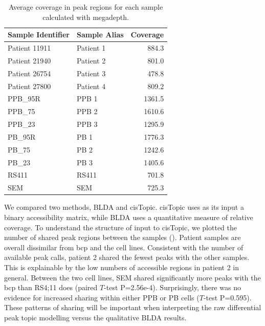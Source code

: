 \begin{table}[]
    \centering
    \begin{tabular}{@{}llr@{}}
    \toprule
    Sample Identifier & Sample Alias & Coverage \\ \midrule
    Patient 11911     & Patient 1    & 884.3                        \\
    Patient 21940     & Patient 2    & 801.0                        \\
    Patient 26754     & Patient 3    & 478.8                        \\
    Patient 27800     & Patient 4    & 809.2                        \\
    PPB\_95R          & PPB 1        & 1361.5                       \\
    PPB\_75           & PPB 2        & 1610.6                       \\
    PPB\_23           & PPB 3        & 1295.9                       \\
    PB\_95R           & PB 1         & 1776.3                       \\
    PB\_75            & PB 2         & 1242.6                       \\
    PB\_23            & PB 3         & 1405.6                       \\
    RS411             & RS411        & 701.8                        \\
    SEM               & SEM          & 725.3                        \\ \bottomrule
    \end{tabular}
    \caption{Average coverage in peak regions for each sample calculated with megadepth.}
    \label{table:mll_cov}
\end{table}

We compared two methods, BLDA and cisTopic. cisTopic uses as its input a binary accessibility matrix, while BLDA uses a quantitative measure of relative coverage. To understand the structure of input to cisTopic, we plotted the number of shared peak regions between the samples (). Patient samples are overall dissimilar from \gls{bcp} and the cell lines. Consistent with the number of available peak calls, patient 2 shared the fewest peaks with the other samples. This is explainable by the low numbers of accessible regions in patient 2 in general. Between the two cell lines, SEM shared significantly more peaks with the \gls{bcp} than RS4;11 does (paired $T$-test P=2.56e-4). Surprisingly, there was no evidence for increased sharing within either PPB or PB cells ($T$-test P=0.595). These patterns of sharing will be important when interpreting the raw differential peak topic modelling versus the qualitative BLDA results.

